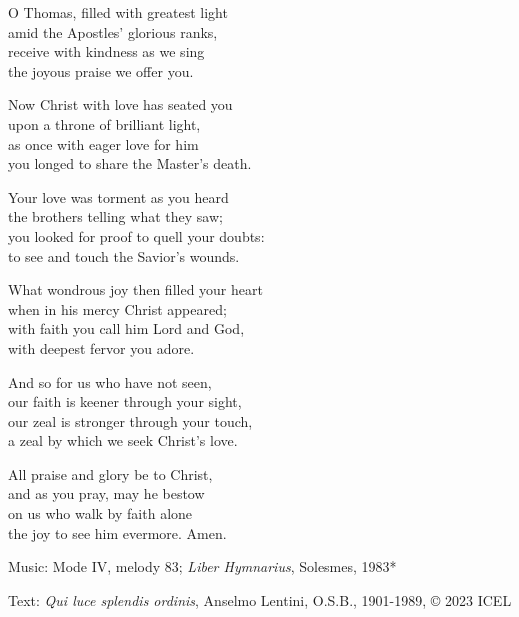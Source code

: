 \hymn

\begin{hymnverse}
O Thomas, filled with greatest light\\
amid the Apostles’ glorious ranks,\\
receive with kindness as we sing\\
the joyous praise we offer you.

Now Christ with love has seated you\\
upon a throne of brilliant light,\\
as once with eager love for him\\
you longed to share the Master’s death.

Your love was torment as you heard\\
the brothers telling what they saw;\\
you looked for proof to quell your doubts:\\
to see and touch the Savior’s wounds.

What wondrous joy then filled your heart\\
when in his mercy Christ appeared;\\
with faith you call him Lord and God,\\
with deepest fervor you adore.

And so for us who have not seen,\\
our faith is keener through your sight,\\
our zeal is stronger through your touch,\\
a zeal by which we seek Christ’s love.

All praise and glory be to Christ,\\
and as you pray, may he bestow\\
on us who walk by faith alone\\
the joy to see him evermore. Amen.
\end{hymnverse}

\begin{hymnsource}
Music: Mode IV, melody 83; \emph{Liber Hymnarius}, Solesmes, 1983*

Text: \emph{Qui luce splendis ordinis}, Anselmo Lentini, O.S.B., 1901-1989, © 2023 ICEL
\end{hymnsource}
